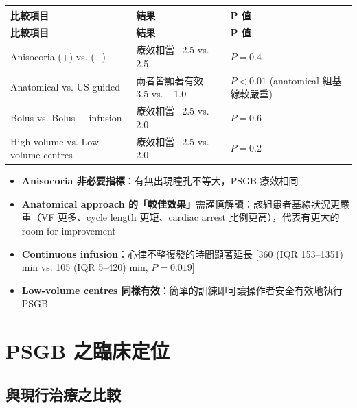 \documentclass[12pt,a4paper]{article}
\begin{document}
\begin{longtable}{p{5cm}p{4cm}p{4.5cm}}
\toprule
\textbf{比較項目} & \textbf{結果} & \textbf{P 值} \\
\midrule
\endfirsthead

\toprule
\textbf{比較項目} & \textbf{結果} & \textbf{P 值} \\
\midrule
\endhead

\bottomrule
\endfoot

Anisocoria (+) vs. ($-$) & 療效相當\newline $-$2.5 vs. $-$2.5 & $P = 0.4$ \\
\midrule
Anatomical vs. US-guided & 兩者皆顯著有效\newline $-$3.5 vs. $-$1.0 & $P < 0.01$ (anatomical 組基線較嚴重) \\
\midrule
Bolus vs. Bolus + infusion & 療效相當\newline $-$2.5 vs. $-$2.0 & $P = 0.6$ \\
\midrule
High-volume vs. Low-volume centres & 療效相當\newline $-$2.5 vs. $-$2.0 & $P = 0.2$ \\
\bottomrule
\end{longtable}

\begin{itemize}
    \item \textbf{Anisocoria 非必要指標}：有無出現瞳孔不等大，PSGB 療效相同
    \item \textbf{Anatomical approach 的「較佳效果」}需謹慎解讀：該組患者基線狀況更嚴重（VF 更多、cycle length 更短、cardiac arrest 比例更高），代表有更大的 room for improvement
    \item \textbf{Continuous infusion}：心律不整復發的時間顯著延長 [360 (IQR 153--1351) min vs. 105 (IQR 5--420) min, $P = 0.019$]
    \item \textbf{Low-volume centres 同樣有效}：簡單的訓練即可讓操作者安全有效地執行 PSGB
\end{itemize}

\section{PSGB 之臨床定位}

\subsection{與現行治療之比較}
\end{document}
